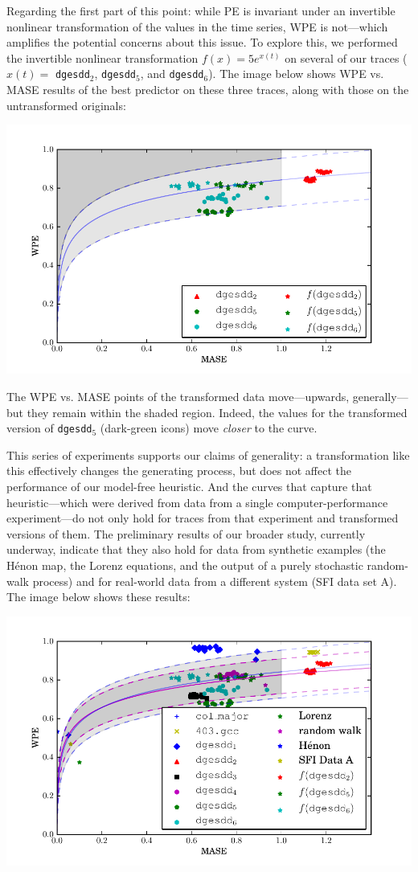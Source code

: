 \documentclass[12pt]{article}
\begin{document}
Regarding the first part of this point: while PE is invariant under an
invertible nonlinear transformation of the values in the time series,
WPE is not---which amplifies the potential concerns about this issue.
To explore this, we performed the invertible nonlinear transformation
$f(x)=5e^{x(t)}$ on several of our traces ($x(t)=$ {\tt dgesdd}$_2$,
{\tt dgesdd}$_5$, and {\tt dgesdd}$_6$).  The image below shows WPE
vs. MASE results of the best predictor on these three traces, along
with those on the untransformed originals:

\begin{center}
    \includegraphics[width=0.8\columnwidth]{figs/nonlinear_transform_data}
\end{center}

The WPE vs. MASE points of the transformed data move---upwards,
generally---but they remain within the shaded region.  Indeed, the
values for the transformed version of {\tt dgesdd}$_5$ (dark-green
icons) move {\sl closer} to the curve.

This series of experiments supports our claims of generality: a
transformation like this effectively changes the generating process,
but does not affect the performance of our model-free heuristic.  And
the curves that capture that heuristic---which were derived from data
from a single computer-performance experiment---do not only hold for
traces from that experiment and transformed versions of them.  The
preliminary results of our broader study, currently underway, indicate
that they also hold for data from synthetic examples (the H\'{e}non
map, the Lorenz equations, and the output of a purely stochastic
random-walk process) and for real-world data from a different system
(SFI data set A).  The image below shows these results:

\begin{center}
    \includegraphics[width=0.8\columnwidth]{figs/new_prediction_vs_entropy_extras_with_nonlinear_all_points}
\end{center}
\end{document}
